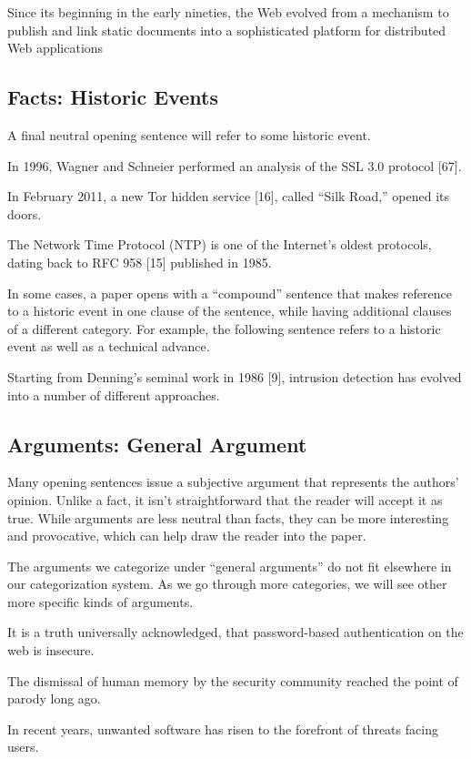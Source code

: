 \documentclass[sigconf]{acmart}
\begin{document}
	Since its beginning in the early nineties, the Web evolved from a mechanism to publish and link static documents into a sophisticated platform for distributed Web applications
	
\subsection{Facts: Historic Events}
	
	A final neutral opening sentence will refer to some historic event. 
	
	In 1996, Wagner and Schneier performed an analysis of the SSL 3.0 protocol [67].
	
	In February 2011, a new Tor hidden service [16], called “Silk Road,” opened its 
	doors.
	
	The Network Time Protocol (NTP) is one of the Internet’s oldest protocols, dating back to RFC 958 [15] published in 1985.
	
	In some cases, a paper opens with a “compound” sentence that makes reference to a historic event in one clause of the sentence, while having additional clauses of a different category. For example, the following sentence refers to a historic event as well as a technical advance.
	
	Starting from Denning’s seminal work in 1986 [9], intrusion detection has evolved into a number of different approaches.
	
\subsection{Arguments: General Argument}
	
	Many opening sentences issue a subjective argument that represents the authors’ opinion. Unlike a fact, it isn’t straightforward that the reader will accept it as true. While arguments are less neutral than facts, they can be more interesting and provocative, which can help draw the reader into the paper.
	
	The arguments we categorize under “general arguments” do not fit elsewhere in our categorization system. As we go through more categories, we will see other more specific kinds of arguments. 
	
	It is a truth universally acknowledged, that password-based authentication on the web is insecure.
	
	The dismissal of human memory by the security community reached the point of parody long ago.
	
	In recent years, unwanted software has risen to the forefront of threats facing users.
	
\end{document}
